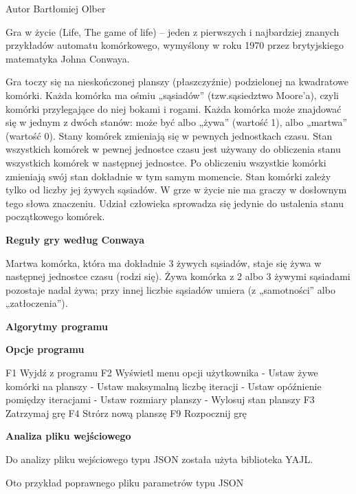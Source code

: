 \begin{DoxyAuthor}{Autor}
Bartłomiej Olber
\end{DoxyAuthor}
Gra w życie (Life, The game of life) – jeden z pierwszych i najbardziej znanych przykładów automatu komórkowego, wymyślony w roku 1970 przez brytyjskiego matematyka Johna Conwaya.

Gra toczy się na nieskończonej planszy (płaszczyźnie) podzielonej na kwadratowe komórki. Każda komórka ma ośmiu „sąsiadów” (tzw.\+sąsiedztwo Moore’a), czyli komórki przylegające do niej bokami i rogami. Każda komórka może znajdować się w jednym z dwóch stanów\+: może być albo „żywa” (wartość 1), albo „martwa” (wartość 0). Stany komórek zmieniają się w pewnych jednostkach czasu. Stan wszystkich komórek w pewnej jednostce czasu jest używany do obliczenia stanu wszystkich komórek w następnej jednostce. Po obliczeniu wszystkie komórki zmieniają swój stan dokładnie w tym samym momencie. Stan komórki zależy tylko od liczby jej żywych sąsiadów. W grze w życie nie ma graczy w dosłownym tego słowa znaczeniu. Udział człowieka sprowadza się jedynie do ustalenia stanu początkowego komórek.

{\bfseries Reguły gry według Conwaya} \begin{DoxyVerb}Martwa komórka, która ma dokładnie 3 żywych sąsiadów, staje się żywa 
w następnej jednostce czasu (rodzi się).
Żywa komórka z 2 albo 3 żywymi sąsiadami pozostaje nadal żywa; 
przy innej liczbie sąsiadów umiera (z „samotności” albo „zatłoczenia”).
\end{DoxyVerb}


{\bfseries Algorytmy programu}



{\bfseries Opcje programu} \begin{DoxyVerb}F1  Wyjdź z programu
F2  Wyświetl menu opcji użytkownika 
     - Ustaw żywe komórki na planszy
     - Ustaw maksymalną liczbę iteracji
     - Ustaw opóźnienie pomiędzy iteracjami
     - Ustaw rozmiary planszy 
     - Wylosuj stan planszy
F3  Zatrzymaj grę
F4  Strórz nową planszę
F9  Rozpocznij grę   
\end{DoxyVerb}


{\bfseries Analiza pliku wejściowego}

Do analizy pliku wejściowego typu J\+S\+ON została użyta biblioteka Y\+A\+JL.

Oto przykład poprawnego pliku parametrów typu J\+S\+ON

 
